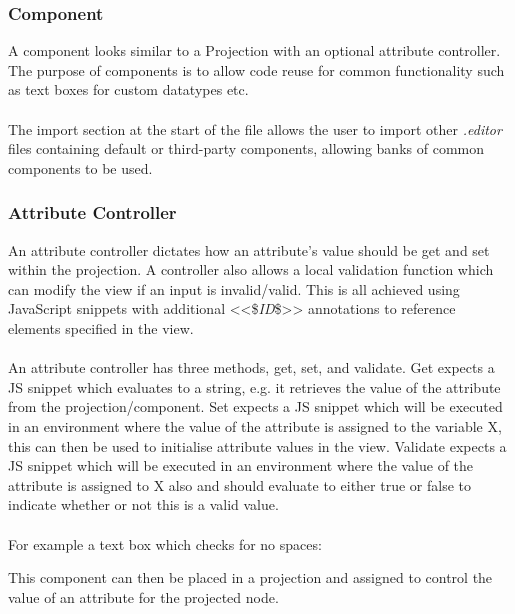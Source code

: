 \documentclass{article}
\begin{document}
{\subsubsection{Component}


A component looks similar to a Projection with an optional attribute controller. The purpose of components is to allow code reuse for common functionality such as text boxes for custom datatypes etc.
\\
\\
The import section at the start of the file allows the user to import other \emph{.editor} files containing default or third-party components, allowing banks of common components to be used.

\subsubsection{Attribute Controller}

An attribute controller dictates how an attribute's value should be get and set within the projection. A controller also allows a local validation function which can modify the view if an input is invalid/valid. This is all achieved using JavaScript snippets with additional <<\$\emph{ID}\$>> annotations to reference elements specified in the view.
\\
\\
An attribute controller has three methods, get, set, and validate. Get expects a JS snippet which evaluates to a string, e.g. it retrieves the value of the attribute from the projection/component. Set expects a JS snippet which will be executed in an environment where the value of the attribute is assigned to the variable X, this can then be used to initialise attribute values in the view. Validate expects a JS snippet which will be executed in an environment where the value of the attribute is assigned to X also and should evaluate to either true or false to indicate whether or not this is a valid value. 
\\
\\
For example a text box which checks for no spaces: 

This component can then be placed in a projection and assigned to control the value of an attribute for the projected node.

}
\end{document}

